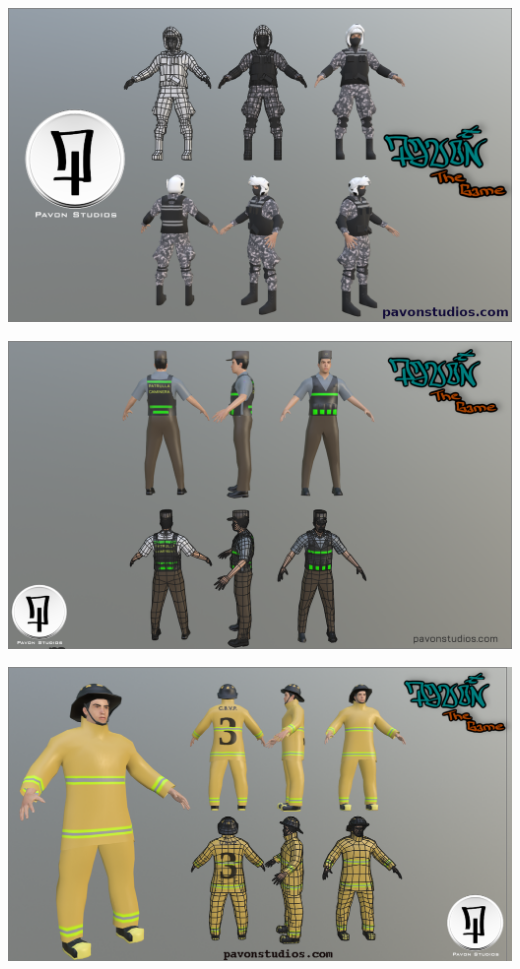 \documentclass{article}
\begin{document}
  \includegraphics[width=\textwidth]{76.png}

  \includegraphics[width=\textwidth]{77.png}

  \includegraphics[width=\textwidth]{78.png}
\end{document}
